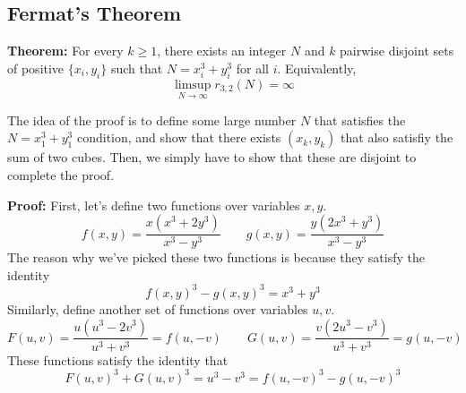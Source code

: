 \documentclass[8pt]{extarticle}
\begin{document}
\subsection{Fermat's Theorem}
\begin{boxedsection}
\textbf{Theorem:} For every $k \geq 1$, there exists an integer $N$ and $k$ pairwise disjoint sets of positive $\{x_i,y_i\}$ such that $N = x_i^3 + y_i^3$ for all $i$. Equivalently,
$$
\limsup_{N\rightarrow \infty} r_{3,2}(N) = \infty
$$
\end{boxedsection}
The idea of the proof is to define some large number $N$ that satisfies the $N = x_1^3 + y_1^3$ condition, and show that there exists $(x_k, y_k)$ that also satisfiy the sum of two cubes. Then, we simply have to show that these are disjoint to complete the proof. 
\begin{boxedsection}
\textbf{Proof:} First, let's define two functions over variables $x,y$.
$$
f(x,y) = \frac{x(x^3 + 2y^3)}{x^3 - y^3} \quad \quad g(x,y) = \frac{y(2x^3 + y^3)}{x^3 - y^3}
$$
The reason why we've picked these two functions is because they satisfy the identity
$$
f(x,y)^3 - g(x,y)^3 = x^3 + y^3
$$
Similarly, define another set of functions over variables $u,v$. 
$$
F(u,v) = \frac{u(u^3 - 2v^3)}{u^3 + v^3} = f(u,-v) \quad \quad G(u,v) = \frac{v(2u^3 - v^3)}{u^3 + v^3} = g(u,-v)
$$
These functions satisfy the identity that
$$
F(u,v)^3 + G(u,v)^3 = u^3 - v^3 = f(u,-v)^3 - g(u,-v)^3 
$$
\end{boxedsection}
\pagebreak
\end{document}
